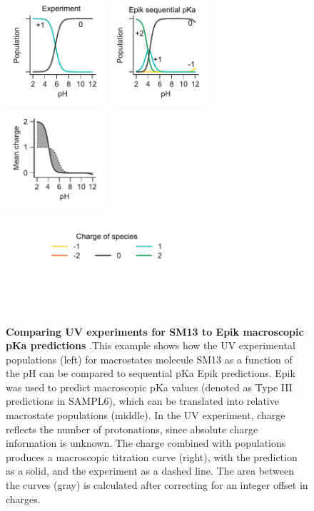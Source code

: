 \documentclass[9pt,lineno,final]{elife}
\begin{document}
\begin{figure}[H]
	\centering
	\includegraphics[width=0.33\textwidth]{Reports/Experiment-populations-SM13-titled.pdf}
	\includegraphics[width=0.33\textwidth]{Reports/Epik-TypeIII-populations-SM13-titled.pdf}
	\includegraphics[width=0.33\textwidth]{Reports/Epik-TypeIII-virtual-titration-SM13.pdf}\\
	\includegraphics[width=0.66\textwidth, trim={0 2cm 0 1cm},clip]{Reports/overview-charge-legend-2.pdf}
		\caption{{\bf Comparing UV experiments for SM13 to Epik macroscopic pKa predictions} .This example shows how the UV experimental populations (left) for macrostates molecule SM13 as a function of the pH can be compared to sequential pKa Epik predictions. Epik was used to predict macroscopic pKa values (denoted as Type III predictions in SAMPL6), which can be translated into relative macrostate populations (middle). In the UV experiment, charge reflects the number of protonations, since absolute charge information is unknown. The charge combined with populations produces a macroscopic titration curve (right), with the prediction as a solid, and the experiment as a dashed line. The area between the curves (gray) is calculated after correcting for an integer offset in charges.    
	\label{fig:epikiii-prediction}}
\end{figure}
\end{document}
